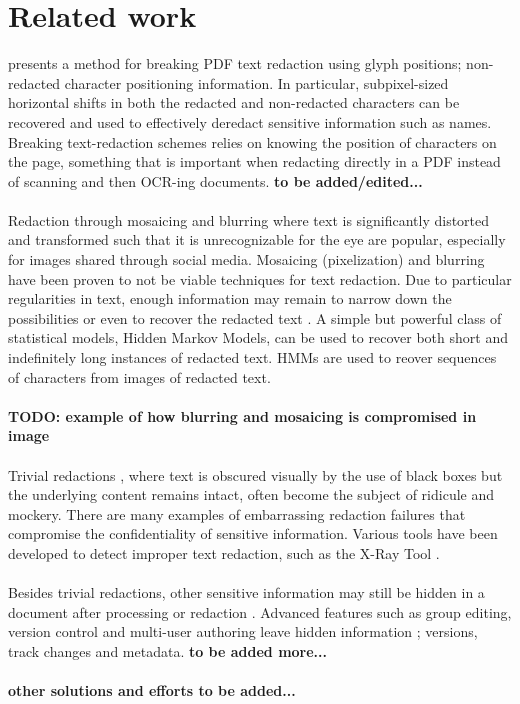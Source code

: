 \chapter{Related work}

\cite{bland2022story} presents a method for breaking PDF text redaction using glyph positions; non-redacted character positioning information. In particular, subpixel-sized horizontal shifts in both the redacted and non-redacted characters can be recovered and used to effectively deredact sensitive information such as names. Breaking text-redaction schemes relies on knowing the position of characters on the page, something that is important when redacting directly in a PDF instead of scanning and then OCR-ing documents. \textbf{to be added/edited...}
\\\\
Redaction through mosaicing and blurring where text is significantly distorted and transformed such that it is unrecognizable for the eye are popular, especially for images shared through social media. Mosaicing (pixelization) and blurring have been proven to not be viable techniques for text redaction. Due to particular regularities in text, enough information may remain to narrow down the possibilities or even to recover the redacted text \cite{hill2016effectiveness}. A simple but powerful class of statistical models, Hidden Markov Models, can be used to recover both short and indefinitely long instances of redacted text. HMMs are used to reover sequences of characters from images of redacted text. 
\\\\
\textbf{TODO: example of how blurring and mosaicing is compromised in image}
\\\\
Trivial redactions \cite{forrester2005investigation}, where text is obscured visually by the use of black boxes but the underlying content remains intact, often become the subject of ridicule and mockery. There are many examples of embarrassing redaction failures \cite{failures2019} that compromise the confidentiality of  sensitive information. Various tools have been developed to detect improper text redaction, such as the X-Ray Tool \cite{Xray2021}.
\\\\
Besides trivial redactions, other sensitive information may still be hidden in a document after processing or redaction \cite{muller2021processing}. Advanced features such as group editing, version control and multi-user authoring leave hidden information \cite{forrester2005investigation}; versions, track changes and metadata. \textbf{to be added more...}
\\\\
\textbf{other solutions and efforts to be added...}
